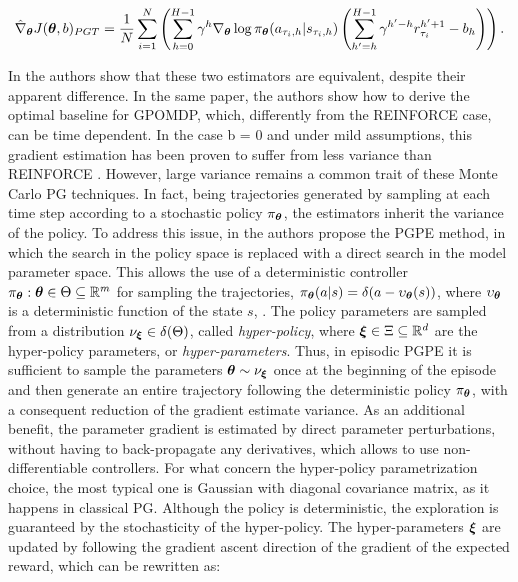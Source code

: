 \begin{align}
\hat{\nabla}_{\boldsymbol{\theta}}J(\boldsymbol{\theta}, b)_{PGT} = \frac{1}{N}\sum_{i=1}^{N}\left(\sum_{h=0}^{H-1}\gamma^h\nabla_{\boldsymbol{\theta}}\log\pi_{\boldsymbol{\theta}}(a_{\tau_i,h}|s_{\tau_i,h})\left(\sum_{h'=h}^{H-1}\gamma^{h'-h}r^{h'+1}_{\tau_i} - b_h\right)\right).
\end{align}

In \cite{peters2008reinforcement} the authors show that these two estimators are equivalent, despite their apparent difference. In the same paper, the authors show how to derive the optimal baseline for \gls{GPOMDP}, which, differently from the  REINFORCE case, can be time dependent. In the case b = 0 and under mild assumptions, this gradient estimation has been proven to suffer from less variance than REINFORCE \cite{zhao2011analysis}. However, large variance remains a common trait of these Monte Carlo \gls{PG} techniques. In fact, being trajectories generated by sampling at each time step according to a stochastic policy $\pi_{\boldsymbol{\theta}}$, the estimators inherit the variance of the policy. To address this issue, in \cite{sehnke2008policy} the authors propose the \gls{PGPE} method, in which the search in the policy space is replaced with a direct search in the model parameter space. This allows the use of a deterministic controller $\pi_{\boldsymbol{\theta}}: \boldsymbol{\theta}\in\Theta\subseteq\mathbb{R}^m$ for sampling the trajectories, \ie $\pi_{\boldsymbol{\theta}}(a|s)=\delta(a-\upsilon_{\boldsymbol{\theta}}(s))$, where $\upsilon_{\boldsymbol{\theta}}$ is a deterministic function of the state $s$, \eg \cite{sehnke2010parameter}. The policy parameters are sampled from a distribution $\nu_{\boldsymbol{\xi}}\in\delta(\Theta)$, called \emph{hyper-policy}, where $\boldsymbol{\xi}\in\Xi\subseteq\mathbb{R}^d$ are the hyper-policy parameters, or \emph{hyper-parameters}. Thus, in episodic \gls{PGPE} it is sufficient to sample the parameters $\boldsymbol{\theta}\sim\nu_{\boldsymbol{\xi}}$ once at the beginning of the episode and then generate an entire trajectory following the deterministic policy $\pi_{\boldsymbol{\theta}}$, with a consequent reduction of the gradient estimate variance. As an additional benefit, the parameter gradient is estimated by direct parameter perturbations, without having to back-propagate any derivatives, which allows to use non-differentiable controllers. For what concern the hyper-policy parametrization choice, the most typical one is Gaussian with diagonal covariance matrix, as it happens in classical \gls{PG}. Although the policy is deterministic, the exploration is guaranteed by the stochasticity of the hyper-policy. The hyper-parameters $\boldsymbol{\xi}$ are updated by following the gradient ascent direction of the gradient of the expected reward, which can be rewritten as:

